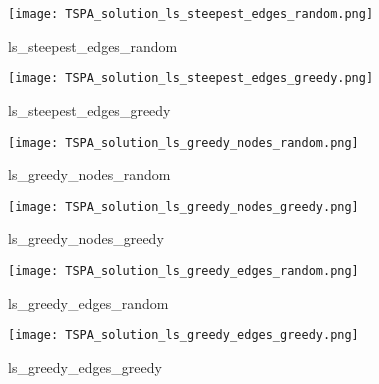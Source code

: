 \begin{figure}[!htbp]
\centering
\texttt{[image: TSPA\_solution\_ls\_steepest\_edges\_random.png]}
\caption{\label{fig:frog}ls\_steepest\_edges\_random}
\end{figure}

\newpage

\begin{figure}[!htbp]
\centering
\texttt{[image: TSPA\_solution\_ls\_steepest\_edges\_greedy.png]}
\caption{\label{fig:frog}ls\_steepest\_edges\_greedy}
\end{figure}

\begin{figure}[!htbp]
\centering
\texttt{[image: TSPA\_solution\_ls\_greedy\_nodes\_random.png]}
\caption{\label{fig:frog}ls\_greedy\_nodes\_random}
\end{figure}

\begin{figure}[!htbp]
\centering
\texttt{[image: TSPA\_solution\_ls\_greedy\_nodes\_greedy.png]}
\caption{\label{fig:frog}ls\_greedy\_nodes\_greedy}
\end{figure}

\begin{figure}[!htbp]
\centering
\texttt{[image: TSPA\_solution\_ls\_greedy\_edges\_random.png]}
\caption{\label{fig:frog}ls\_greedy\_edges\_random}
\end{figure}

\begin{figure}[!htbp]
\centering
\texttt{[image: TSPA\_solution\_ls\_greedy\_edges\_greedy.png]}
\caption{\label{fig:frog}ls\_greedy\_edges\_greedy}
\end{figure}
